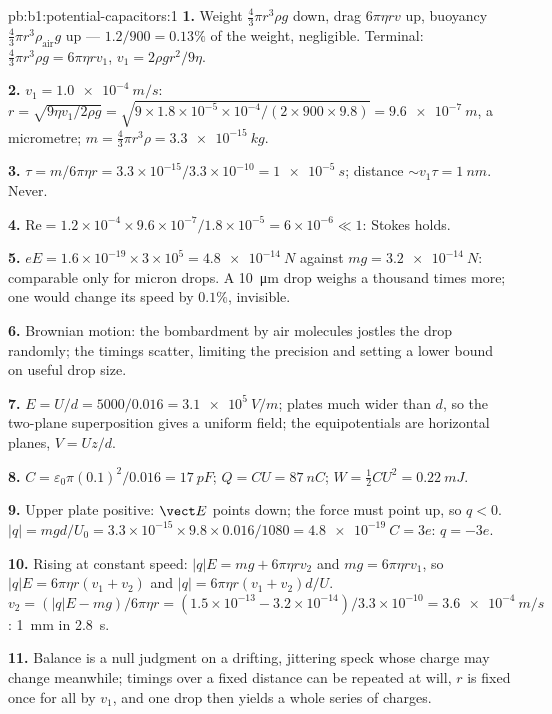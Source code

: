 \begin{solution}{pb:b1:potential-capacitors:1}
\textbf{1.} Weight $\tfrac43\pi r^3\rho g$ down, drag $6\pi\eta rv$ up,
buoyancy $\tfrac43\pi r^3\rho_{\text{air}}g$ up --- $1.2/900 = 0.13\%$ of the
weight, negligible. Terminal: $\tfrac43\pi r^3\rho g = 6\pi\eta rv_1$, $v_1 =
2\rho gr^2/9\eta$.

\textbf{2.} $v_1 = \qty{1.0e-4}{m/s}$: $r = \sqrt{9\eta v_1/2\rho g} = \sqrt{9 \times
1.8 \times 10^{-5} \times 10^{-4}/(2 \times 900 \times 9.8)} = \qty{9.6e-7}{m}$, a
micrometre; $m = \tfrac43\pi r^3\rho = \qty{3.3e-15}{kg}$.

\textbf{3.} $\tau = m/6\pi\eta r = 3.3 \times 10^{-15}/3.3 \times 10^{-10} = \qty{1e-5}{s}$;
distance $\sim v_1\tau = \qty{1}{nm}$. Never.

\textbf{4.} $\mathrm{Re} = 1.2 \times 10^{-4} \times 9.6 \times 10^{-7}/1.8 \times 10^{-5} =
6 \times 10^{-6} \ll 1$: Stokes holds.

\textbf{5.} $eE = 1.6 \times 10^{-19} \times 3 \times 10^5 = \qty{4.8e-14}{N}$ against
$mg = \qty{3.2e-14}{N}$: comparable only for micron drops. A \qty{10}{\micro m}
drop weighs a thousand times more; one  would change
its speed by $0.1\%$, invisible.

\textbf{6.} Brownian motion: the bombardment by air molecules jostles
the drop randomly; the timings scatter, limiting the precision and
setting a lower bound on useful drop size.

\textbf{7.} $E = U/d = 5000/0.016 = \qty{3.1e5}{V/m}$; plates much wider than
$d$, so the two-plane superposition gives a uniform field; the
equipotentials are horizontal planes, $V = Uz/d$.

\textbf{8.} $C = \varepsilon_0\pi(0.1)^2/0.016 = \qty{17}{pF}$; $Q = CU = \qty{87}{nC}$;
$W = \tfrac12CU^2 = \qty{0.22}{mJ}$.

\textbf{9.} Upper plate positive: $\vect E$ points down; the force must
point up, so $q < 0$. $|q| = mgd/U_0 = 3.3 \times 10^{-15} \times 9.8 \times 0.016/
1080 = \qty{4.8e-19}{C} = 3e$: $q = -3e$.

\textbf{10.} Rising at constant speed: $|q|E = mg + 6\pi\eta rv_2$ and $mg =
6\pi\eta rv_1$, so $|q|E = 6\pi\eta r(v_1 + v_2)$ and $|q| = 6\pi\eta r(v_1 +
v_2)d/U$. $v_2 = (|q|E - mg)/6\pi\eta r = (1.5 \times 10^{-13} - 3.2 \times 10^{-14})/
3.3 \times 10^{-10} = \qty{3.6e-4}{m/s}$: \qty{1}{mm} in \qty{2.8}{s}.

\textbf{11.} Balance is a null judgment on a drifting, jittering speck
whose charge may change meanwhile; timings over a fixed distance can be
repeated at will, $r$ is fixed once for all by $v_1$, and one drop then
yields a whole series of charges.


\end{solution}
